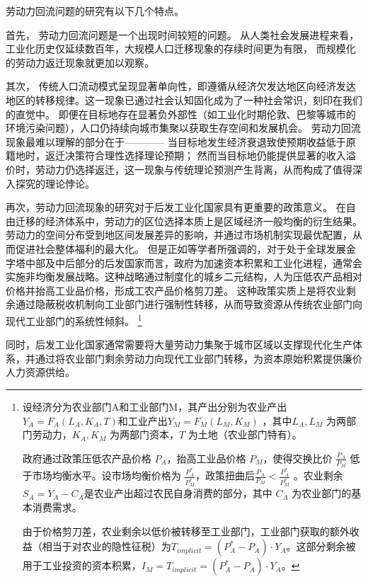 \documentclass[a4paper, zihao=-4, fontset = mac, oneside]{ctexbook} %
\let\oldfootnote\footnote
\renewcommand{\footnote}[1]{%
  \oldfootnote{\setstretch{1.5}#1}%
}
\begin{document}
劳动力回流问题的研究有以下几个特点。

首先，
劳动力回流问题是一个出现时间较短的问题。
从人类社会发展进程来看，工业化历史仅延续数百年，大规模人口迁移现象的存续时间更为有限，
而规模化的劳动力返迁现象就更加以观察。

其次，
传统人口流动模式呈现显著单向性，即遵循从经济欠发达地区向经济发达地区的转移规律。这一现象已通过社会认知固化成为了一种社会常识，刻印在我们的直觉中。
即便在目标地存在显著负外部性（如工业化时期伦敦、巴黎等城市的环境污染问题），人口仍持续向城市集聚以获取生存空间和发展机会。
劳动力回流现象最难以理解的部分在于————
当目标地发生经济衰退致使预期收益低于原籍地时，返迁决策符合理性选择理论预期；
然而当目标地仍能提供显著的收入溢价时，劳动力仍选择返迁，这一现象与传统理论预测产生背离，从而构成了值得深入探究的理论悖论。

再次，劳动力回流现象的研究对于后发工业化国家具有更重要的政策意义。  
在自由迁移的经济体系中，劳动力的区位选择本质上是区域经济一般均衡的衍生结果。劳动力的空间分布受到地区间发展差异的影响，并通过市场机制实现最优配置，从而促进社会整体福利的最大化。
但是正如\textcite{CaiFangHuJiZhiDuYuLaoDongLiShiChangBaoHu2001}等学者所强调的，对于处于全球发展金字塔中部及中后部分的后发国家而言，政府为加速资本积累和工业化进程，通常会实施非均衡发展战略。这种战略通过制度化的城乡二元结构，人为压低农产品相对价格并抬高工业品价格，形成工农产品价格剪刀差。
这种政策实质上是将农业剩余通过隐蔽税收机制向工业部门进行强制性转移，从而导致资源从传统农业部门向现代工业部门的系统性倾斜。
\footnote{
  设经济分为农业部门A和工业部门M，其产出分别为农业产出\( Y_A = F_A(L_A, K_A, T) \)和工业产出\( Y_M = F_M(L_M, K_M) \) ，其中\( L_A, L_M \) 为两部门劳动力，\( K_A, K_M \) 为两部门资本，\( T \) 为土地（农业部门特有）。

  政府通过政策压低农产品价格 \( P_A \)，抬高工业品价格 \( P_M \)，使得交换比价 \( \frac{P_A}{P_M} \) 低于市场均衡水平。设市场均衡价格为 \( \frac{P_A^*}{P_M^*} \)，政策扭曲后\(\frac{P_A}{P_M} < \frac{P_A^*}{P_M^*}\) 。农业剩余\(S_A = Y_A - C_A\)是农业产出超过农民自身消费的部分，其中 \( C_A \) 为农业部门的基本消费需求。  

  由于价格剪刀差，农业剩余以低价被转移至工业部门，工业部门获取的额外收益（相当于对农业的隐性征税）为\(T_{implicit} = (P_A^* - P_A) \cdot Y_A\)。这部分剩余被用于工业投资的资本积累，\(I_M = T_{implicit} = (P_A^* - P_A) \cdot Y_A\)。
}
同时，后发工业化国家通常需要将大量劳动力集聚于城市区域以支撑现代化生产体系，并通过将农业部门剩余劳动力向现代工业部门转移，为资本原始积累提供廉价人力资源供给。
\end{document}
